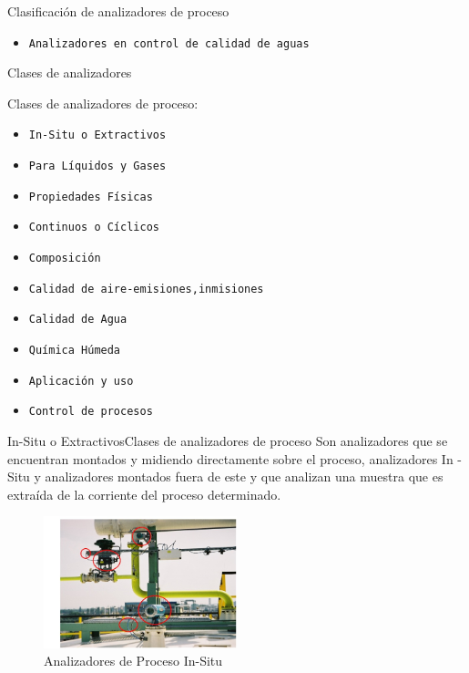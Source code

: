 \documentclass[10pt]{beamer}
\begin{document}
{\begin{frame}{Clasificación de analizadores de proceso}{}
\begin{block}{ }
\begin{itemize}
    \item {\tt Analizadores en control de calidad de aguas}
  	\end{itemize}
	\end{block}
\end{frame}
\begin{frame}{Clases de analizadores}{ }
\begin{block}{ }
Clases de analizadores de proceso:
  	\begin{itemize}
    \item {\tt In-Situ o Extractivos}
    \item {\tt Para Líquidos y Gases}
    \item {\tt Propiedades Físicas}
    \item {\tt Continuos o Cíclicos}
    \item {\tt Composición}
    \item {\tt Calidad de aire-emisiones,inmisiones}
    \item {\tt Calidad de Agua}
    \item {\tt Química Húmeda}
    \item {\tt Aplicación y uso}
    \item {\tt Control de procesos}
  	\end{itemize}
	\end{block}
    \end{frame}



\begin{frame}{In-Situ o Extractivos}{Clases de analizadores de proceso}
Son analizadores que se encuentran montados y midiendo directamente sobre el proceso, analizadores In -Situ y analizadores montados fuera de este y que analizan una muestra que es extraída de la corriente del proceso determinado. 
\begin{figure}%
\includegraphics[width=0.5\textwidth]{figura_7.jpg} %
\caption{\label{fig:3}Analizadores de Proceso In-Situ} %
\end{figure}
\end{frame}

}
\end{document}
